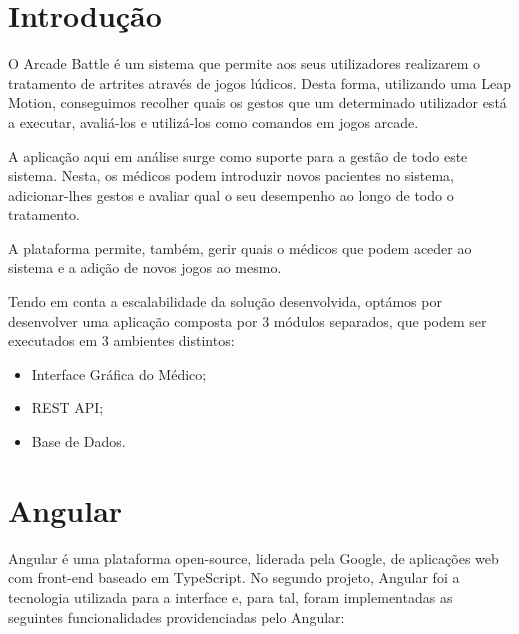 \documentclass[12pt]{article}
\begin{document}
\tableofcontents
\pagebreak

\lstlistoflistings
\pagebreak


\section{Introdução}
O Arcade Battle é um sistema que permite aos seus utilizadores realizarem o tratamento de artrites através de jogos lúdicos. Desta forma, utilizando uma Leap Motion, conseguimos recolher quais os gestos que um determinado utilizador está a executar, avaliá-los e utilizá-los como comandos em jogos arcade.
\par A aplicação aqui em análise surge como suporte para a gestão de todo este sistema. Nesta, os médicos podem introduzir novos pacientes no sistema, \mbox{adicionar-lhes} gestos e avaliar qual o seu desempenho ao longo de todo o tratamento.
\par A plataforma permite, também, gerir quais o médicos que podem aceder ao sistema e a adição de novos jogos ao mesmo.

\par Tendo em conta a escalabilidade da solução desenvolvida, optámos por desenvolver uma aplicação composta por 3 módulos separados, que podem ser executados em 3 ambientes distintos:

\begin{itemize}
  \item Interface Gráfica do Médico;
  \item REST API;
  \item Base de Dados.
\end{itemize}
\clearpage


\section{Angular}

Angular é uma plataforma open-source, liderada pela Google, de aplicações web  com front-end baseado em TypeScript. No segundo projeto, Angular foi a tecnologia utilizada para a interface e, para tal, foram implementadas as seguintes funcionalidades providenciadas pelo Angular:
\end{document}
